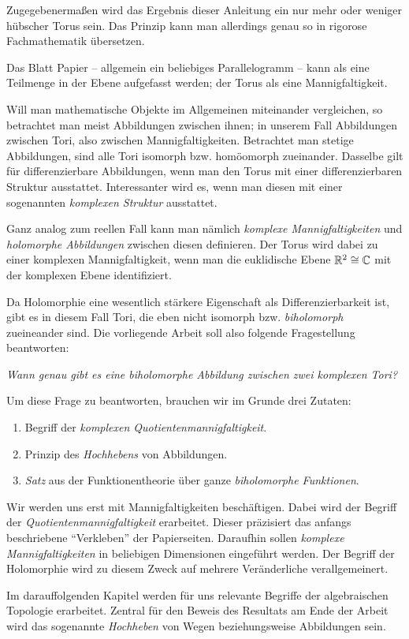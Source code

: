 Zugegebenermaßen wird das Ergebnis dieser Anleitung ein nur mehr oder weniger hübscher Torus sein. Das Prinzip kann man allerdings genau so in rigorose Fachmathematik übersetzen. 

Das Blatt Papier -- allgemein ein beliebiges Parallelogramm -- kann als eine Teilmenge in der Ebene aufgefasst werden; der Torus als eine Mannigfaltigkeit. 

Will man mathematische Objekte im Allgemeinen miteinander vergleichen, so betrachtet man meist Abbildungen zwischen ihnen; in unserem Fall Abbildungen zwischen Tori, also zwischen Mannigfaltigkeiten. Betrachtet man stetige Abbildungen, sind alle Tori isomorph bzw. homöomorph zueinander. Dasselbe gilt für differenzierbare Abbildungen, wenn man den Torus mit einer differenzierbaren Struktur ausstattet. Interessanter wird es, wenn man diesen mit einer sogenannten \emph{komplexen Struktur} ausstattet.

Ganz analog zum reellen Fall kann man nämlich \emph{komplexe Mannigfaltigkeiten} und \emph{holomorphe Abbildungen} zwischen diesen definieren. Der Torus wird dabei zu einer komplexen Mannigfaltigkeit, wenn man die euklidische Ebene \(\mathbb{R}^2 \cong \mathbb{C}\) mit der komplexen Ebene identifiziert.


Da Holomorphie eine wesentlich stärkere Eigenschaft als Differenzierbarkeit ist, gibt es in diesem Fall Tori, die eben nicht isomorph bzw. \emph{biholomorph} zueineander sind. Die vorliegende Arbeit soll also folgende Fragestellung beantworten:
\begin{marked}
	\begin{center}
		\emph{Wann genau gibt es eine biholomorphe Abbildung zwischen zwei komplexen Tori?}
	\end{center}
\end{marked}
Um diese Frage zu beantworten, brauchen wir im Grunde drei Zutaten:
\begin{enumerate}[1.]
	\item Begriff der \emph{komplexen Quotientenmannigfaltigkeit}.
	\item Prinzip des \emph{Hochhebens} von Abbildungen.
	\item \emph{Satz} aus der Funktionentheorie über ganze \emph{biholomorphe Funktionen}.
\end{enumerate}

Wir werden uns erst mit Mannigfaltigkeiten beschäftigen. Dabei wird der Begriff der \emph{Quotientenmannigfaltigkeit} erarbeitet. Dieser präzisiert das anfangs beschriebene \enquote{Verkleben} der Papierseiten.
Daraufhin sollen \emph{kom\-plexe Mannigfaltigkeiten} in beliebigen Dimensionen eingeführt werden. Der Begriff der Holomorphie wird zu diesem Zweck auf mehrere Veränderliche verallgemeinert. 

Im darauffolgenden Kapitel werden für uns relevante Begriffe der algebraischen Topologie erarbeitet. Zentral für den Beweis des Resultats am Ende der Arbeit wird das sogenannte \emph{Hochheben} von Wegen beziehungsweise Abbildungen sein.
